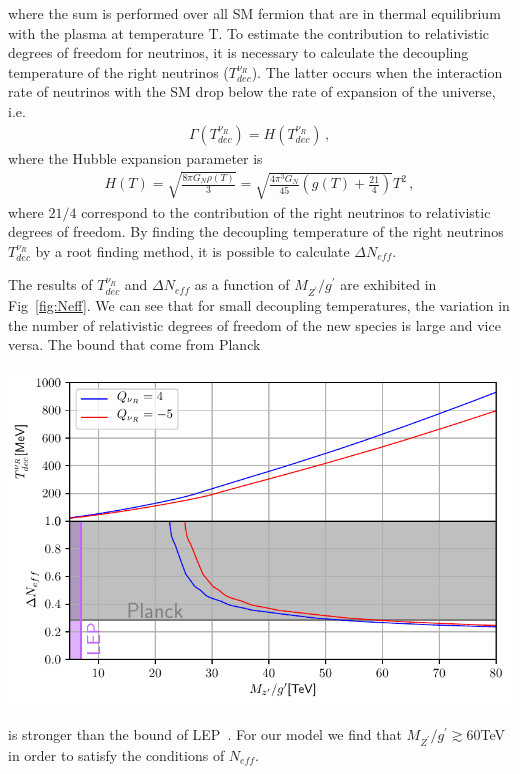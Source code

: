 \documentclass[12pt]{article}
\begin{document}
%
where the sum is performed over all SM fermion that are in thermal equilibrium with the plasma at temperature T. To estimate the contribution to relativistic degrees of freedom for neutrinos, it is necessary to calculate the decoupling temperature of the right neutrinos ($T^{\nu_R}_{dec}$). The latter occurs when the interaction rate of neutrinos with the SM drop below the rate of expansion of the universe, i.e.
%
\begin{align*}
\Gamma(T^{\nu_R}_{dec}) = H(T^{\nu_R}_{dec})\,, 
\end{align*}
%
where the Hubble expansion parameter is
%
\begin{align*}
    H(T) = \sqrt{\frac{8 \pi G_{N} \rho(T)}{3}} = \sqrt{\frac{4 \pi^{3} G_{N}}{45} \left( g(T) + \frac{21}{4} \right)} T^{2}\,,
\end{align*}
%
where $21/4$ correspond to the contribution of the right neutrinos to relativistic degrees of freedom. By finding the decoupling temperature of the right neutrinos $T^{\nu_R}_{dec} $ by a root finding method, it is possible to calculate $\Delta N_{eff}$.

The results of $T^{\nu_R}_{dec}$ and $\Delta N_{eff}$ as a function of $M_{Z^{\prime}}/g^{\prime}$ are exhibited in Fig~\ref{fig:Neff}. We can see that for small decoupling temperatures, the variation in the number of relativistic degrees of freedom of the new species is large and vice versa. The bound that come from Planck~\cite{ghanim:2018eyx}

\includegraphics[scale=0.9]{DeltaNeff.pdf}

is stronger than the bound of LEP~\cite{Alioli:2017nzr}. For our model we find that $M_{Z^{\prime}}/g^{\prime} \gtrsim 60$TeV in order to satisfy the conditions of $N_{eff}$.

\appendix

%
%
%

%

\end{document}
